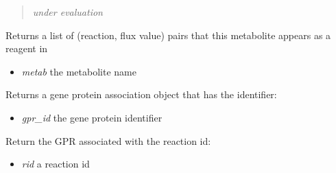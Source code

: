 \documentclass[a4paper,11pt,english]{sphinxmanual}
\begin{document}
\begin{fulllineitems}
\begin{fulllineitems}
\begin{quote}
\begin{itemize}
\end{itemize}

\emph{under evaluation}
\end{quote}

\end{fulllineitems}


\begin{fulllineitems}
\label{modules_doc:cbmpy.CBModel.Model.getFluxesAssociatedWithSpecies}
Returns a list of (reaction, flux value) pairs that this metabolite appears as a reagent in
\begin{itemize}
\item {} 
\emph{metab} the metabolite name

\end{itemize}

\end{fulllineitems}


\begin{fulllineitems}
\label{modules_doc:cbmpy.CBModel.Model.getGPRassociation}
Returns a gene protein association object that has the identifier:
\begin{itemize}
\item {} 
\emph{gpr\_id} the gene protein identifier

\end{itemize}

\end{fulllineitems}


\begin{fulllineitems}
\label{modules_doc:cbmpy.CBModel.Model.getGPRforReaction}
Return the GPR associated with the reaction id:
\begin{itemize}
\item {} 
\emph{rid} a reaction id

\end{itemize}

\end{fulllineitems}



\end{fulllineitems}
\end{document}
